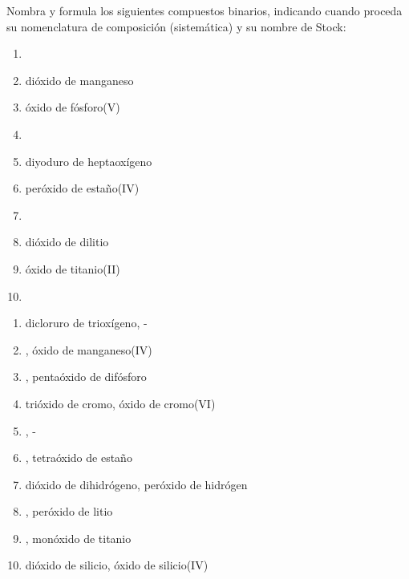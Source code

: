 \documentclass[10pt,a5paper,twoside]{article}
\begin{document}
\begin{exercise}[
    tags    = {inorgánica,compuestos binarios,óxidos,peróxidos},
    topics  = {química inorgánica,formulación,nomenclatura},
    source  = {SAN Formulación, p27, e32},
  ]
  Nombra y formula los siguientes compuestos binarios, indicando cuando proceda su nomenclatura de composición (sistemática) y su nombre de Stock:

  \begin{enumerate}
    \item {}
    \item dióxido de manganeso
    \item óxido de fósforo(V)
    \item {}
    \item diyoduro de heptaoxígeno
    \item peróxido de estaño(IV)
    \item {}
    \item dióxido de dilitio
    \item óxido de titanio(II)
    \item {}
  \end{enumerate}
\end{exercise}

\begin{solution}
  \begin{enumerate}
    \item dicloruro de trioxígeno, -
    \item {}, óxido de manganeso(IV)
    \item {}, pentaóxido de difósforo
    \item trióxido de cromo, óxido de cromo(VI)
    \item {}, -
    \item {}, tetraóxido de estaño
    \item dióxido de dihidrógeno, peróxido de hidrógen
    \item {}, peróxido de litio
    \item {}, monóxido de titanio
    \item dióxido de silicio, óxido de silicio(IV)
  \end{enumerate}
\end{solution}
\end{document}
